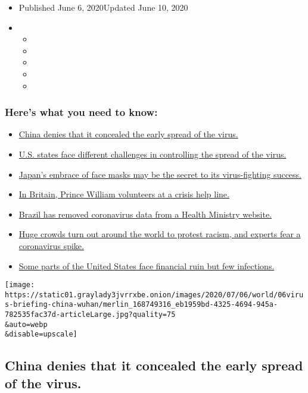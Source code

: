 \begin{itemize}
\item
  Published June 6, 2020Updated June 10, 2020
\item
  \begin{itemize}
  \item
  \item
  \item
  \item
  \item
  \end{itemize}
\end{itemize}

\hypertarget{heres-what-you-need-to-know}{%
\subsubsection{Here's what you need to
know:}\label{heres-what-you-need-to-know}}

\begin{itemize}
\tightlist
\item
  \protect\hyperlink{link-285448fa}{China denies that it concealed the
  early spread of the virus.}
\item
  \protect\hyperlink{link-4015bf10}{U.S. states face different
  challenges in controlling the spread of the virus.}
\item
  \protect\hyperlink{link-30049c69}{Japan's embrace of face masks may be
  the secret to its virus-fighting success.}
\item
  \protect\hyperlink{link-8fd8820}{In Britain, Prince William volunteers
  at a crisis help line.}
\item
  \protect\hyperlink{link-3cfab740}{Brazil has removed coronavirus data
  from a Health Ministry website.}
\item
  \protect\hyperlink{link-435acae9}{Huge crowds turn out around the
  world to protest racism, and experts fear a coronavirus spike.}
\item
  \protect\hyperlink{link-117b4aa5}{Some parts of the United States face
  financial ruin but few infections.}
\end{itemize}

\texttt{[image: https://static01.graylady3jvrrxbe.onion/images/2020/07/06/world/06virus-briefing-china-wuhan/merlin\_168749316\_eb1959bd-4325-4694-945a-782535fac37d-articleLarge.jpg?quality=75\\\&auto=webp\\\&disable=upscale]}

\hypertarget{china-denies-that-it-concealed-the-early-spread-of-the-virus}{%
\subsection{China denies that it concealed the early spread of the
virus.}\label{china-denies-that-it-concealed-the-early-spread-of-the-virus}}

